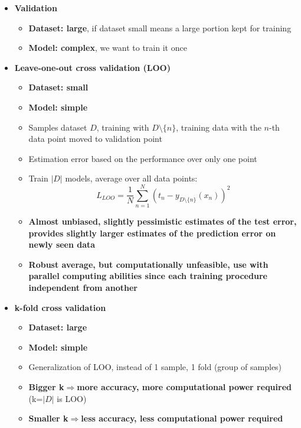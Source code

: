     \begin{itemize}
        \item \textbf{Validation}
        \begin{itemize}
            \item \textbf{Dataset: large}, if dataset small means a large portion kept for training
            \item \textbf{Model: complex}, we want to train it once
        \end{itemize}
        \item \textbf{Leave-one-out cross validation (LOO)}
        \begin{itemize}
            \item \textbf{Dataset: small}
            \item \textbf{Model: simple}
            \item Samples dataset $D$, training with $D\setminus\{n\}$, training data with the $n$-th data point moved to validation point
            \item Estimation error based on the performance over only one point
            \item Train $|D|$ models, average over all data points:
            $$L_{LOO}=\frac{1}{N}\sum_{n=1}^N(t_n-y_{D\setminus\{n\}}(x_n))^2$$
            \item \textbf{Almost unbiased, slightly pessimistic estimates of the test error, provides slightly larger estimates of the prediction error on newly seen data}
            \item \textbf{Robust average, but computationally unfeasible, use with parallel computing abilities since each training procedure independent from another}
        \end{itemize}
        \item \textbf{k-fold cross validation}
        \begin{itemize}
            \item \textbf{Dataset: large}
            \item \textbf{Model: simple}
            \item Generalization of LOO, instead of 1 sample, 1 fold (group of samples)
            \item \textbf{Bigger k$\Rightarrow$more accuracy, more computational power required} (k=$|D|$ is LOO)
            \item \textbf{Smaller k$\Rightarrow$less accuracy, less computational power required}
        \end{itemize}

\end{itemize}
